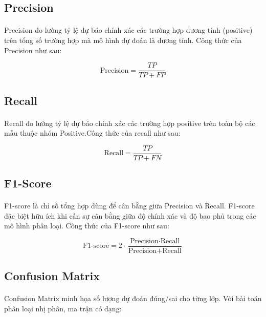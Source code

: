 \subsection{Precision}
\paragraph{}{Precision đo lường tỷ lệ dự báo chính xác các trường hợp dương tính (positive) trên tổng số trường hợp mà mô hình dự đoán là dương tính. Công thức của Precision như sau:}

\[
\text{Precision} = \frac{TP}{TP + FP}
\]

\subsection{Recall}

\paragraph{}{Recall đo lường tỷ lệ dự báo chính xác các trường hợp positive trên toàn bộ các mẫu thuộc nhóm Positive.Công thức của recall như sau:}

\[
\text{Recall} = \frac{TP}{TP + FN}
\]

\subsection{F1-Score}

\paragraph{}{F1-score là chỉ số tổng hợp dùng để cân bằng giữa Precision và Recall. F1-score đặc biệt hữu ích khi cần sự cân bằng giữa độ chính xác và độ bao phủ trong các mô hình phân loại. Công thức của F1-score như sau:}

\[
\text{F1-score} = 2 \cdot \frac{\text{Precision} \cdot \text{Recall}}{\text{Precision} + \text{Recall}}
\]

\subsection{Confusion Matrix}

\paragraph{}{Confusion Matrix minh họa số lượng dự đoán đúng/sai cho từng lớp. Với bài toán phân loại nhị phân, ma trận có dạng:}

